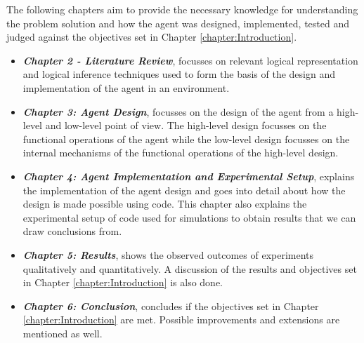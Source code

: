 The following chapters aim to provide the necessary knowledge for understanding the problem solution and how the agent was designed, implemented, tested and judged against the objectives set in Chapter \ref{chapter:Introduction}. 

\begin{itemize}
	

	\item \textbf{\textit{Chapter 2 -  Literature Review}}, focusses on relevant logical representation and logical inference techniques used to form the basis of the design and implementation of the agent in an environment.

	\item \textbf{\textit{Chapter 3: Agent Design}}, focusses on the design of the agent from a high-level and low-level point of view. The high-level design focusses on the functional operations of the agent while the low-level design focusses on the internal mechanisms of the functional operations of the high-level design.
	
	\item \textbf{\textit{Chapter 4: Agent Implementation and Experimental Setup}}, explains the implementation of the agent design and goes into detail about how the design is made possible using code. This chapter also explains the experimental setup of code used for simulations to obtain results that we can draw conclusions from. 
	
	\item \textbf{\textit{Chapter 5: Results}}, shows the observed outcomes of experiments qualitatively and quantitatively. A discussion of the results and objectives set in Chapter \ref{chapter:Introduction} is also done.
	
	\item \textbf{\textit{Chapter 6: Conclusion}}, concludes if the objectives set in Chapter \ref{chapter:Introduction} are met. Possible improvements and extensions are mentioned as well.
\end{itemize}
















